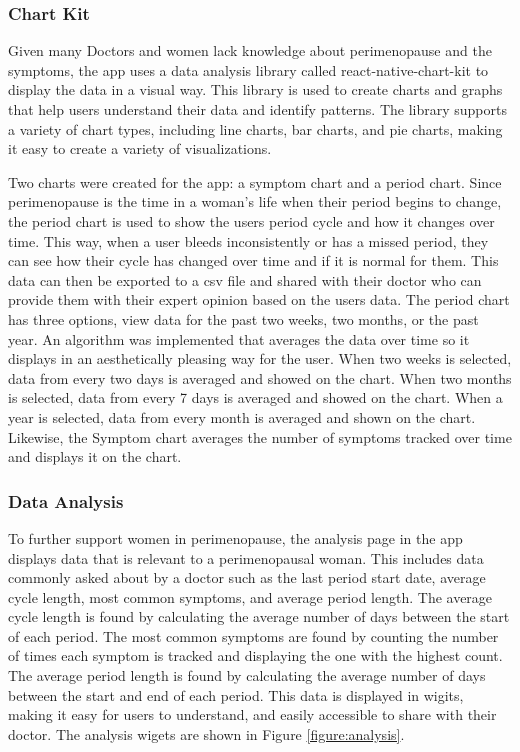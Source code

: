 \subsubsection{Chart Kit}
Given many Doctors and women lack knowledge about perimenopause and the symptoms, the app uses a data analysis library called react-native-chart-kit to display the data in a visual way. This library is used to create charts and graphs that help users understand their data and identify patterns. The library supports a variety of chart types, including line charts, bar charts, and pie charts, making it easy to create a variety of visualizations. 

Two charts were created for the app: a symptom chart and a period chart. Since perimenopause is the time in a woman's life when their period begins to change, the period chart is used to show the users period cycle and how it changes over time. This way, when a user bleeds inconsistently or has a missed period, they can see how their cycle has changed over time and if it is normal for them. This data can then be exported to a csv file and shared with their doctor who can provide them with their expert opinion based on the users data. The period chart has three options, view data for the past two weeks, two months, or the past year. An algorithm was implemented that averages the data over time so it displays in an aesthetically pleasing way for the user. When two weeks is selected, data from every two days is averaged and showed on the chart. When two months is selected, data from every 7 days is averaged and showed on the chart. When a year is selected, data from every month is averaged and shown on the chart. Likewise, the Symptom chart averages the number of symptoms tracked over time and displays it on the chart. 

\subsubsection{Data Analysis}
To further support women in perimenopause, the analysis page in the app displays data that is relevant to a perimenopausal woman. This includes data commonly asked about by a doctor such as the last period start date, average cycle length, most common symptoms, and average period length. The average cycle length is found by calculating the average number of days between the start of each period. The most common symptoms are found by counting the number of times each symptom is tracked and displaying the one with the highest count. The average period length is found by calculating the average number of days between the start and end of each period. This data is displayed in wigits, making it easy for users to understand, and easily accessible to share with their doctor. The analysis wigets are shown in Figure \ref{figure:analysis}.

